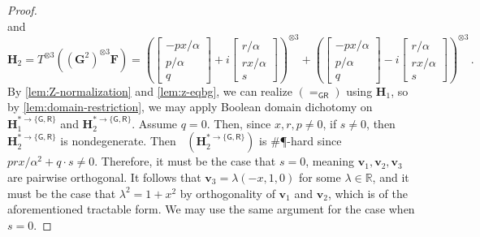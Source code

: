 \documentclass[11pt]{article}
\DeclareMathOperator{\hols}{Holant^*}
\newcommand{\dg}{\mathsf{G}}
\newcommand{\dr}{\mathsf{R}}
\newcommand{\sph}{\#\P-hard\xspace}
\newcommand{\teh}{^{\otimes 3}}
\newcommand{\domres}[1]{
  ^{*\to\{#1\}}
}
\begin{document}
\begin{proof}
\[\]
and
\[
  \mathbf{H}_2 = 
  T\teh ( (\mathbf{G}^2)\teh \mathbf{F}) = \left(\begin{bmatrix}
      -px/\alpha \\ p/\alpha \\ q
      \end{bmatrix} + i \begin{bmatrix}
      r/\alpha \\ rx/\alpha \\ s
  \end{bmatrix}\right)
  \teh + \left(
    \begin{bmatrix}
      -px/\alpha \\ p/\alpha \\ q
      \end{bmatrix} -i      \begin{bmatrix}
      r/\alpha \\ rx/\alpha \\ s
  \end{bmatrix} \right)\teh
  \, .
\]
By \cref{lem:Z-normalization} and \cref{lem:z-eqbg}, 
we can realize $(=_{\dg \dr})$ using $\mathbf{H}_1$, so by \cref{lem:domain-restriction}, we may apply Boolean domain dichotomy on 
$\mathbf{H}_1\domres{\dg, \dr}$ and $\mathbf{H}_2\domres{\dg, \dr}$.
Assume $q = 0$.
Then, since $x, r, p \ne 0$, if $s \ne 0$, then $\mathbf{H}_2\domres{\dg, \dr}$ is nondegenerate.
Then $\hols(\mathbf{H}_2\domres{\dg, \dr})$ is \sph since $prx/\alpha^2 + q \cdot s \ne 0$.
Therefore, it must be the case that $s = 0$, meaning $\mathbf{v}_1, \mathbf{v}_2, \mathbf{v}_3$ are pairwise orthogonal.
It follows that $\mathbf{v}_3 = \lambda(-x, 1, 0)$ for some $\lambda \in \mathbb{R}$, and it must be the case that $\lambda^2 = 1 + x^2$ by orthogonality of $\mathbf{v}_1$ and $\mathbf{v}_2$, which is of the aforementioned tractable form.
We may use the same argument for the case when $s = 0$.
\end{proof}
\end{document}
